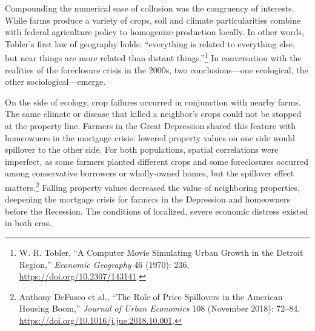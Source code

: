 \documentclass[12pt,oneside]{psthesis}
\begin{document}
Compounding the numerical ease of collusion was the congruency of interests.
While farms produce a variety of crops, soil and climate particularities combine with federal agriculture policy to homogenize production locally.
In other words, Tobler's first law of geography holds: ``everything is related to everything else, but near things are more related than distant things.''\footnote{W. R. Tobler, ``A Computer Movie Simulating Urban Growth in the Detroit Region,'' \emph{Economic Geography} 46 (1970): 236, \url{https://doi.org/10.2307/143141}.}
In conversation with the realities of the foreclosure crisis in the 2000s, two conclusions---one ecological, the other sociological---emerge.

On the side of ecology, crop failures occurred in conjunction with nearby farms.
The same climate or disease that killed a neighbor's crops could not be stopped at the property line.
Farmers in the Great Depression shared this feature with homeowners in the mortgage crisis: lowered property values on one side would spillover to the other side.
For both populations, spatial correlations were imperfect, as some farmers planted different crops and some foreclosures occurred among conservative borrowers or wholly-owned homes, but the spillover effect matters.\footnote{Anthony DeFusco et al., ``The Role of Price Spillovers in the American Housing Boom,'' \emph{Journal of Urban Economics} 108 (November 2018): 72--84, \url{https://doi.org/10.1016/j.jue.2018.10.001}.}
Falling property values decreased the value of neighboring properties, deepening the mortgage crisis for farmers in the Depression and homeowners before the Recession.
The conditions of localized, severe economic distress existed in both eras.
\end{document}
